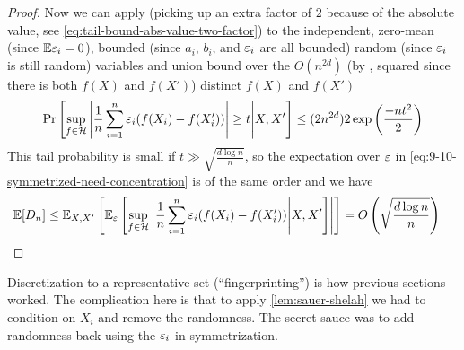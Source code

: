 \begin{proof}
    Now we can apply  (picking up an extra factor of $2$ because
    of the absolute value, see \cref{eq:tail-bound-abs-value-two-factor}) to the independent,
    zero-mean (since $\mathbb{E} \varepsilon_i = 0$),
    bounded (since $a_i$, $b_i$, and $\varepsilon_i$ are all bounded)
    random (since $\varepsilon_i$ is still random) variables
    and union bound over the $O(n^{2d})$ (by , squared since there is both $f(X)$ and $f(X')$) distinct $f(X)$ and $f(X')$
    \begin{align}
        \Pr\left[ \sup_{f \in \mathcal{H}}
            \left\lvert \frac{1}{n} \sum_{i=1}^n \varepsilon_i(f(X_i) - f(X_i')) \right\rvert \geq t 
        \middle| X, X' \right]
        &\leq (2 n^{2d}) 2 \exp\left(\frac{-n t^2}{2} \right) \\
    \end{align}
    This tail probability is small if $t \gg \sqrt{\frac{d \log n}{n}}$, so 
    the expectation over $\varepsilon$ in \cref{eq:9-10-symmetrized-need-concentration} is of the same order
    and we have
    \begin{align}
        \mathbb{E}[D_n]
        &\leq \mathbb{E}_{X, X'}\left[
            \mathbb{E}_{\varepsilon}\left[
                \sup_{f \in \mathcal{H}} \left\lvert \frac{1}{n} \sum_{i=1}^n \varepsilon_i ( f(X_i) - f(X_i') ) 
                \middle| X, X'\right]
        \right\rvert\right]
        = O\left(
            \sqrt{\frac{d \log n}{n}}
        \right)
    \end{align}
\end{proof}

Discretization to a representative set (``fingerprinting'') is how previous sections worked.
The complication here is that to apply \cref{lem:sauer-shelah} we had to condition on $X_i$ and
remove the randomness. The secret sauce was to add randomness back using the $\varepsilon_i$ in
symmetrization.
